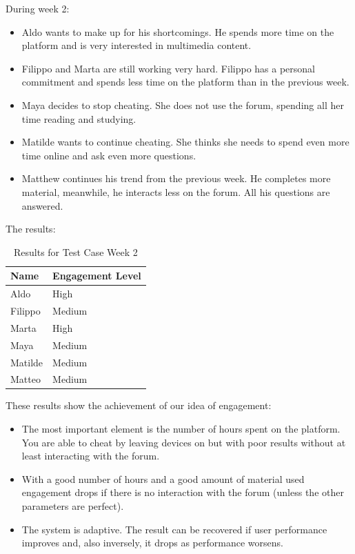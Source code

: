 During week 2:
\begin{itemize}
    \item Aldo wants to make up for his shortcomings. He spends more time on the platform and is very 
    interested in multimedia content.
    \item Filippo and Marta are still working very hard. Filippo has a personal commitment and spends 
    less time on the platform than in the previous week.
    \item Maya decides to stop cheating. She does not use the forum, spending all her time reading and 
    studying.
    \item Matilde wants to continue cheating. She thinks she needs to spend even more time online and 
    ask even more questions.
    \item Matthew continues his trend from the previous week. He completes more material, meanwhile,
    he interacts less on the forum. All his questions are answered.
\end{itemize}

The results:\\
\vspace{1em}
\begin{table}[H]
\centering
\begin{tabular}{l l}
\toprule
Name     & Engagement Level \\
\midrule
Aldo     & High \\
Filippo  & Medium \\
Marta    & High \\
Maya     & Medium \\
Matilde  & Medium \\
Matteo   & Medium \\
\bottomrule
\end{tabular}
\caption{Results for Test Case Week 2}
\end{table}
\vspace{1em}

These results show the achievement of our idea of engagement:
\begin{itemize}
    \item The most important element is the number of hours spent on the platform. You are able to 
    cheat by leaving devices on but with poor results without at least interacting with the forum.
    \item With a good number of hours and a good amount of material used engagement drops if there 
    is no interaction with the forum (unless the other parameters are perfect).
    \item The system is adaptive. The result can be recovered if user performance improves and, 
    also inversely, it drops as performance worsens.
\end{itemize}

